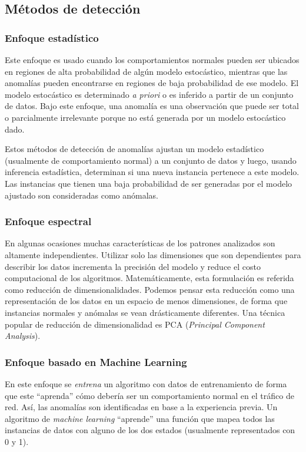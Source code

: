 \documentclass[a4paper,10pt, oneside]{article}
\begin{document}
\subsection{Métodos de detección}
\subsubsection{Enfoque estadístico}
Este enfoque es usado cuando los comportamientos normales pueden ser ubicados en regiones de alta probabilidad de algún modelo estocástico, mientras que las anomalías pueden encontrarse en regiones de baja probabilidad de ese modelo\cite{Chandola:2009:ADS:1541880.1541882}. El modelo estocástico es determinado \textit{a priori} o es inferido a partir de un conjunto de datos. Bajo este enfoque, una anomalía es una observación que puede ser total o parcialmente irrelevante porque no está generada por un modelo estocástico dado. \par
Estos métodos de detección de anomalías ajustan un modelo estadístico (usualmente de comportamiento normal) a un conjunto de datos y luego, usando inferencia estadística, determinan si una nueva instancia pertenece a este modelo. Las instancias que tienen una baja probabilidad de ser generadas por el modelo ajustado son consideradas como anómalas.

\subsubsection{Enfoque espectral}
En algunas ocasiones muchas características de los patrones analizados son altamente independientes. Utilizar solo las dimensiones que son dependientes para describir los datos incrementa la precisión del modelo y reduce el costo computacional de los algoritmos. Matemáticamente, esta formulación es referida como reducción de dimensionalidades\cite{wang2012geometric}. Podemos pensar esta reducción como una representación de los datos en un espacio de menos dimensiones, de forma que instancias normales y anómalas se vean drásticamente diferentes. Una técnica popular de reducción de dimensionalidad es PCA (\textit{Principal Component Analysis}).

\subsubsection{Enfoque basado en Machine Learning}
En este enfoque se \textit{entrena} un algoritmo con datos de entrenamiento de forma que este ``aprenda'' cómo debería ser un comportamiento normal en el tráfico de red. Así, las anomalías son identificadas en base a la experiencia previa. Un algoritmo de \textit{machine learning} ``aprende'' una función que mapea todos las instancias de datos con alguno de los dos estados (usualmente representados con 0 y 1). \par
\end{document}
